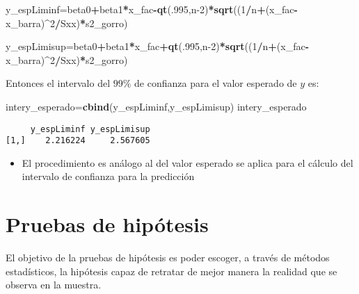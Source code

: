 \documentclass[
  a4paper,
  oneside,
  openany]{book}
\newenvironment{Shaded}{\begin{snugshade}}{\end{snugshade}}
\newcommand{\DecValTok}[1]{\textcolor[rgb]{0.00,0.00,0.81}{#1}}
\newcommand{\KeywordTok}[1]{\textcolor[rgb]{0.13,0.29,0.53}{\textbf{#1}}}
\newcommand{\NormalTok}[1]{#1}
\newcommand{\OperatorTok}[1]{\textcolor[rgb]{0.81,0.36,0.00}{\textbf{#1}}}
\providecommand{\tightlist}{%
  \setlength{\itemsep}{0pt}\setlength{\parskip}{0pt}}
\begin{document}
\begin{Shaded}
\begin{Highlighting}[]
\NormalTok{y\_espLiminf=beta0}\OperatorTok{+}\NormalTok{beta1}\OperatorTok{*}\NormalTok{x\_fac}\OperatorTok{{-}}\KeywordTok{qt}\NormalTok{(.}\DecValTok{995}\NormalTok{,n}\DecValTok{{-}2}\NormalTok{)}\OperatorTok{*}\KeywordTok{sqrt}\NormalTok{((}\DecValTok{1}\OperatorTok{/}\NormalTok{n}\OperatorTok{+}\NormalTok{(x\_fac}\OperatorTok{{-}}\NormalTok{x\_barra)}\OperatorTok{\^{}}\DecValTok{2}\OperatorTok{/}\NormalTok{Sxx)}\OperatorTok{*}\NormalTok{s2\_gorro)}

\NormalTok{y\_espLimisup=beta0}\OperatorTok{+}\NormalTok{beta1}\OperatorTok{*}\NormalTok{x\_fac}\OperatorTok{+}\KeywordTok{qt}\NormalTok{(.}\DecValTok{995}\NormalTok{,n}\DecValTok{{-}2}\NormalTok{)}\OperatorTok{*}\KeywordTok{sqrt}\NormalTok{((}\DecValTok{1}\OperatorTok{/}\NormalTok{n}\OperatorTok{+}\NormalTok{(x\_fac}\OperatorTok{{-}}\NormalTok{x\_barra)}\OperatorTok{\^{}}\DecValTok{2}\OperatorTok{/}\NormalTok{Sxx)}\OperatorTok{*}\NormalTok{s2\_gorro)}
\end{Highlighting}
\end{Shaded}

Entonces el intervalo del \(99\%\) de confianza para el valor esperado de \(y\) es:

\begin{Shaded}
\begin{Highlighting}[]
\NormalTok{intery\_esperado=}\KeywordTok{cbind}\NormalTok{(y\_espLiminf,y\_espLimisup) }
\NormalTok{intery\_esperado}
\end{Highlighting}
\end{Shaded}

\begin{verbatim}
     y_espLiminf y_espLimisup
[1,]    2.216224     2.567605
\end{verbatim}

\begin{itemize}
\tightlist
\item
  El procedimiento es análogo al del valor esperado se aplica para el cálculo del intervalo de confianza para la predicción
\end{itemize}

\hypertarget{pruebas-de-hipuxf3tesis}{%
\chapter{Pruebas de hipótesis}\label{pruebas-de-hipuxf3tesis}}

El objetivo de la pruebas de hipótesis es poder escoger, a través de métodos estadísticos, la hipótesis capaz de retratar de mejor manera la realidad que se observa en la muestra.
\end{document}
